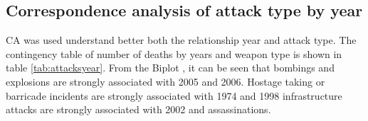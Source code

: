 \subsection{Correspondence analysis of attack type by year}\label{viewing-deaths-by-attack-vector-type-CA}

CA was used understand better both the relationship year and attack type. The contingency table of number of deaths by years and weapon type is shown in table \ref{tab:attacksyear}. From the Biplot , it can be seen that bombings and explosions are strongly associated with 2005 and 2006. Hostage taking or barricade incidents are strongly associated with 1974 and 1998 infrastructure attacks are strongly associated with 2002 and assassinations.




